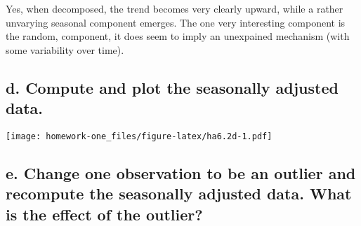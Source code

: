\documentclass[openany]{book}
\newenvironment{Shaded}{\begin{snugshade}}{\end{snugshade}}
\newcommand{\CommentTok}[1]{\textcolor[rgb]{0.56,0.35,0.01}{\textit{#1}}}
\newcommand{\DataTypeTok}[1]{\textcolor[rgb]{0.13,0.29,0.53}{#1}}
\newcommand{\DecValTok}[1]{\textcolor[rgb]{0.00,0.00,0.81}{#1}}
\newcommand{\FloatTok}[1]{\textcolor[rgb]{0.00,0.00,0.81}{#1}}
\newcommand{\KeywordTok}[1]{\textcolor[rgb]{0.13,0.29,0.53}{\textbf{#1}}}
\newcommand{\NormalTok}[1]{#1}
\newcommand{\OperatorTok}[1]{\textcolor[rgb]{0.81,0.36,0.00}{\textbf{#1}}}
\newcommand{\StringTok}[1]{\textcolor[rgb]{0.31,0.60,0.02}{#1}}
\begin{document}
Yes, when decomposed, the trend becomes very clearly upward, while a rather unvarying seasonal component emerges. The one very interesting component is the random, component, it does seem to imply an unexpained mechanism (with some variability over time).

\hypertarget{d.-compute-and-plot-the-seasonally-adjusted-data.}{%
\subsection{d. Compute and plot the seasonally adjusted data.}\label{d.-compute-and-plot-the-seasonally-adjusted-data.}}

\begin{Shaded}
\end{Shaded}

\texttt{[image: homework-one\_files/figure-latex/ha6.2d-1.pdf]}

\hypertarget{e.-change-one-observation-to-be-an-outlier-and-recompute-the-seasonally-adjusted-data.-what-is-the-effect-of-the-outlier}{%
\subsection{e. Change one observation to be an outlier and recompute the seasonally adjusted data. What is the effect of the outlier?}\label{e.-change-one-observation-to-be-an-outlier-and-recompute-the-seasonally-adjusted-data.-what-is-the-effect-of-the-outlier}}
\end{document}
